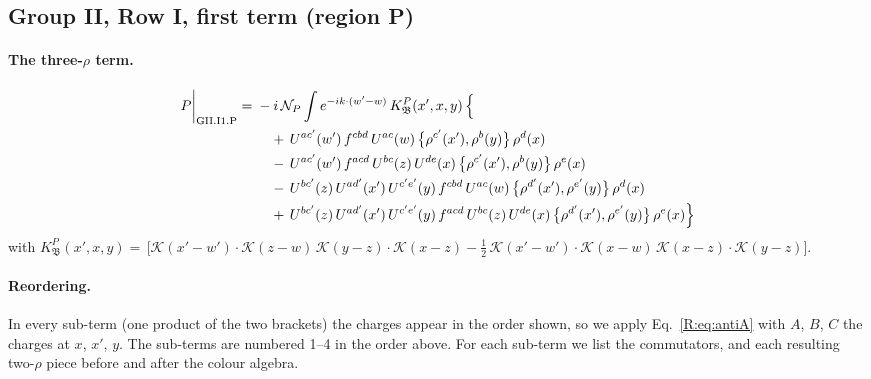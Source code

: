 \documentclass[10pt]{article}
\numberwithin{equation}{section}
\newcommand{\KK}{\mathcal K}
\newcommand{\NP}{\mathcal N_{P}}
\begin{document}
\subsection{Group II, Row I, first term (region P)}\label{B:sec:GII.I1.P}

\paragraph{The three-$\rho$ term.}
\begin{align}
P\bigg|_{\rm GII.I1.P}={}&-i\,\NP\int e^{-ik\cdot(w'-w)}\,K^{P}_{\mathfrak B}(x',x,y)\,\Big\{\notag\\
&\quad +\,U^{ac'}(w')\,f^{cbd}\,U^{ac}(w)\,\big\{\rho^{c'}(x'),\rho^{b}(y)\big\}\,\rho^{d}(x)\notag\\
&\quad -\,U^{ac'}(w')\,f^{acd}\,U^{bc}(z)\,U^{de}(x)\,\big\{\rho^{c'}(x'),\rho^{b}(y)\big\}\,\rho^{e}(x)\notag\\
&\quad -\,U^{bc'}(z)\,U^{ad'}(x')\,U^{c'e'}(y)\,f^{cbd}\,U^{ac}(w)\,\big\{\rho^{d'}(x'),\rho^{e'}(y)\big\}\,\rho^{d}(x)\notag\\
&\quad +\,U^{bc'}(z)\,U^{ad'}(x')\,U^{c'e'}(y)\,f^{acd}\,U^{bc}(z)\,U^{de}(x)\,\big\{\rho^{d'}(x'),\rho^{e'}(y)\big\}\,\rho^{e}(x)\Big\}\label{B:eq:in-GII.I1.P}
\end{align}
with $K^{P}_{\mathfrak B}(x',x,y)=\,\Big[\KK(x'-w')\cdot\KK(z-w)\,\KK(y-z)\cdot\KK(x-z)-\frac{1}{2}\,\KK(x'-w')\cdot\KK(x-w)\,\KK(x-z)\cdot\KK(y-z)\Big]$.
\paragraph{Reordering.} In every sub-term (one product of the two brackets) the charges appear in the order shown, so we apply Eq.~\eqref{R:eq:antiA} with $A$, $B$, $C$ the charges at $x$, $x'$, $y$. The sub-terms are numbered 1--4 in the order above. For each sub-term we list the commutators, and each resulting two-$\rho$ piece before and after the colour algebra.
\end{document}
